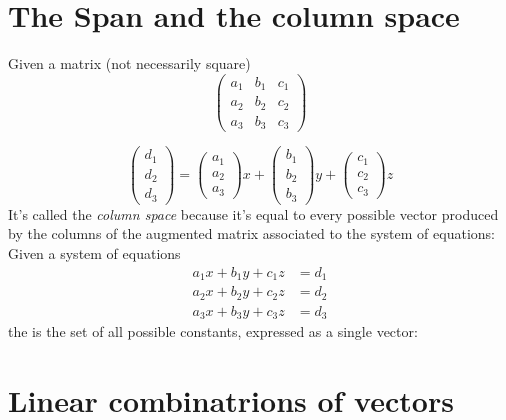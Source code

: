 \documentclass{ximera}
\begin{document}
\section{The Span and the column space}

Given a matrix (not necessarily square)
\[
\begin{pmatrix}
  a_1 &  b_1  &  c_1 \\
  a_2 & b_2 & c_2 \\
  a_3 & b_3 & c_3
\end{pmatrix}
\]

\[
\begin{pmatrix} d_1 \\ d_2 \\ d_3 \end{pmatrix}=\begin{pmatrix} a_1 \\ a_2 \\ a_3 \end{pmatrix} x +
\begin{pmatrix} b_1 \\ b_2 \\ b_3 \end{pmatrix} y +
\begin{pmatrix} c_1 \\ c_2 \\ c_3 \end{pmatrix} z
\]
It's called the \textit{column space} because it's equal to every
possible vector produced by the columns of the augmented matrix
associated to the system of equations:
Given a system of equations
\begin{align*}
  a_1 x + b_1 y + c_1 z &= d_1\\
  a_2 x + b_2 y + c_2 z &= d_2\\
  a_3 x + b_3 y + c_3 z &= d_3
\end{align*}
the  is the set of all possible constants, expressed
as a single vector:





\section{Linear combinatrions of vectors}
\end{document}
